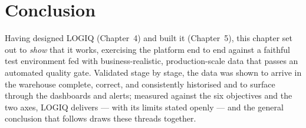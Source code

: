 \section*{Conclusion}

Having designed LOGIQ (Chapter~4) and built it (Chapter~5), this chapter set out to \emph{show} that it
works, exercising the platform end to end against a faithful test environment fed with
business-realistic, production-scale data that passes an automated quality gate. Validated stage by
stage, the data was shown to arrive in the warehouse complete, correct, and consistently historised and
to surface through the dashboards and alerts; measured against the six objectives and the two axes,
LOGIQ delivers --- with its limits stated openly --- and the general conclusion that follows draws these
threads together.
